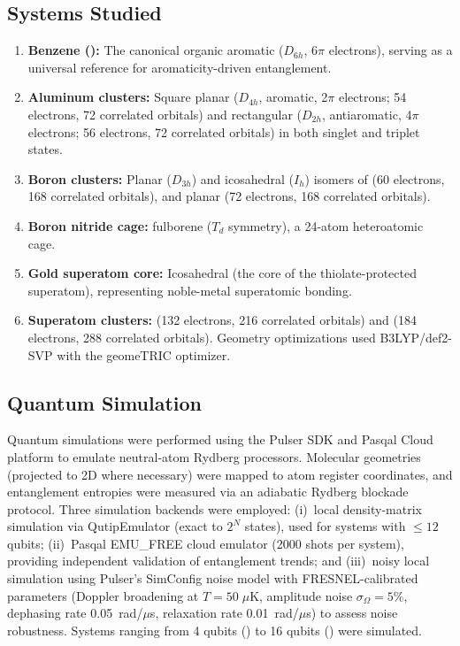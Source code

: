 \documentclass[12pt,a4paper]{article}
\begin{document}
\subsection{Systems Studied}

\begin{enumerate}
  \item \textbf{Benzene ():}
    The canonical organic aromatic ($D_{6h}$, 6$\pi$ electrons),
    serving as a universal reference for aromaticity-driven entanglement.

  \item \textbf{Aluminum clusters:}
    Square planar  ($D_{4h}$, aromatic, 2$\pi$ electrons;
    54 electrons, 72 correlated orbitals)
    and rectangular  ($D_{2h}$, antiaromatic, 4$\pi$ electrons;
    56 electrons, 72 correlated orbitals)
    in both singlet and triplet states.

  \item \textbf{Boron clusters:}
    Planar ($D_{3h}$) and icosahedral ($I_h$) isomers of 
    (60 electrons, 168 correlated orbitals),
    and planar 
    (72 electrons, 168 correlated orbitals).

  \item \textbf{Boron nitride cage:}
     fulborene ($T_d$ symmetry), a 24-atom heteroatomic cage.

  \item \textbf{Gold superatom core:}
    Icosahedral  (the core of the thiolate-protected
     superatom), representing noble-metal
    superatomic bonding.

  \item \textbf{Superatom clusters:}
     (132 electrons, 216 correlated orbitals)
    and  (184 electrons, 288 correlated orbitals).
    Geometry optimizations used B3LYP/def2-SVP with the geomeTRIC
    optimizer.\cite{wang2016geometry}
\end{enumerate}

\subsection{Quantum Simulation}

Quantum simulations were performed using the Pulser SDK and Pasqal Cloud
platform to emulate neutral-atom Rydberg processors.\cite{henriet2020quantum}
Molecular geometries (projected to 2D where necessary) were mapped to
atom register coordinates, and entanglement entropies were measured via
an adiabatic Rydberg blockade protocol. Three simulation backends were employed:
(i)~local density-matrix simulation via QutipEmulator (exact to $2^N$ states),
used for systems with $\leq 12$ qubits;
(ii)~Pasqal EMU\_FREE cloud emulator (2000 shots per system),
providing independent validation of entanglement trends;
and (iii)~noisy local simulation using Pulser's SimConfig noise model
with FRESNEL-calibrated parameters (Doppler broadening at $T = 50\;\mu$K,
amplitude noise $\sigma_\Omega = 5\%$, dephasing rate 0.05~rad/$\mu$s,
relaxation rate 0.01~rad/$\mu$s) to assess noise robustness.
Systems ranging from 4 qubits () to 16 qubits ()
were simulated.
\end{document}
